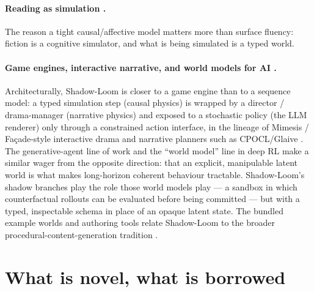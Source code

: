\documentclass[11pt]{article}
\begin{document}
\paragraph{Reading as simulation
\citep{maroatley2008fiction,oatley2016fiction,oatley1995taxonomy,
hogan2003mind}.} The reason a tight causal/affective model
matters more than surface fluency: fiction is a cognitive
simulator, and what is being simulated is a typed world.

\paragraph{Game engines, interactive narrative, and world models
for AI \citep{mateas2003facade,riedl2013interactive,ware2014glaive,
kreminski2020wereyaknow,park2023generative,ha2018world,lecun2022jepa,
hao2023rap,wang2023voyager,smelik2014procedural,
summerville2018pcgml}.} Architecturally, Shadow-Loom is closer to
a game engine than to a sequence model: a typed simulation step
(causal physics) is wrapped by a director / drama-manager
(narrative physics) and exposed to a stochastic policy (the LLM
renderer) only through a constrained action interface, in the
lineage of Mimesis / Fa\c{c}ade-style interactive drama
\citep{mateas2003facade,riedl2013interactive} and narrative
planners such as CPOCL/Glaive \citep{ware2014glaive}. The
generative-agent line of work \citep{park2023generative} and
the ``world model'' line in deep RL
\citep{ha2018world,lecun2022jepa,hao2023rap} make a similar
wager from the opposite direction: that an explicit, manipulable
latent world is what makes long-horizon coherent behaviour
tractable. Shadow-Loom's shadow branches play the role those
world models play --- a sandbox in which counterfactual
rollouts can be evaluated before being committed --- but with a
typed, inspectable schema in place of an opaque latent state.
The bundled example worlds and authoring tools relate
Shadow-Loom to the broader procedural-content-generation
tradition
\citep{smelik2014procedural,summerville2018pcgml,kreminski2020wereyaknow}.


\section{What is novel, what is borrowed}
\label{sec:novelty}
\end{document}

